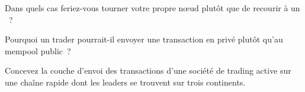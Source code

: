 \begin{interviewq}\label{iq:nw:on-chain-connectivity:4}
Dans quels cas feriez-vous tourner votre propre nœud plutôt que de recourir à un ~?
\end{interviewq}

\begin{interviewq}\label{iq:nw:on-chain-connectivity:5}
Pourquoi un trader pourrait-il envoyer une transaction en privé plutôt qu'au mempool public~?
\end{interviewq}

\begin{interviewq}\label{iq:nw:on-chain-connectivity:6}
Concevez la couche d'envoi des transactions d'une société de trading active sur une chaîne rapide dont les leaders se trouvent sur trois continents.
\end{interviewq}
